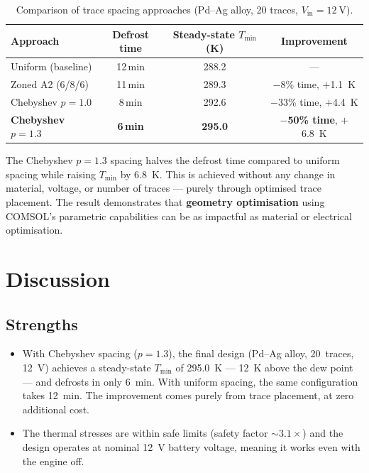 \begin{table}[H]
    \centering
    \caption{Comparison of trace spacing approaches (Pd--Ag alloy, 20 traces, $V_\text{in} = \SI{12}{\volt}$).}
    \label{tab:pattern-comparison}
    \begin{tabular}{@{}lccc@{}}
        \toprule
        \textbf{Approach} & \textbf{Defrost time} & \textbf{Steady-state} $T_\text{min}$ \textbf{(K)} & \textbf{Improvement} \\
        \midrule
        Uniform (baseline)       & 12\,min & 288.2 & --- \\
        Zoned A2 (6/8/6)         & 11\,min & 289.3 & $-$8\% time, $+$\SI{1.1}{\kelvin} \\
        Chebyshev $p = 1.0$      & 8\,min  & 292.6 & $-$33\% time, $+$\SI{4.4}{\kelvin} \\
        \textbf{Chebyshev $p = 1.3$} & \textbf{6\,min} & \textbf{295.0} & $-$\textbf{50\% time}, $+$\SI{6.8}{\kelvin} \\
        \bottomrule
    \end{tabular}
\end{table}

The Chebyshev $p = 1.3$ spacing halves the defrost time compared to uniform spacing while raising $T_\text{min}$ by \SI{6.8}{\kelvin}. This is achieved without any change in material, voltage, or number of traces --- purely through optimised trace placement. The result demonstrates that \textbf{geometry optimisation} using COMSOL's parametric capabilities can be as impactful as material or electrical optimisation.


\section{Discussion}
\label{sec:discussion}

\subsection{Strengths}

\begin{itemize}
    \item With Chebyshev spacing ($p = 1.3$), the final design (Pd--Ag alloy, 20~traces, \SI{12}{\volt}) achieves a steady-state $T_\text{min}$ of \SI{295.0}{\kelvin} --- \SI{12}{\kelvin} above the dew point --- and defrosts in only \SI{6}{\minute}. With uniform spacing, the same configuration takes \SI{12}{\minute}. The improvement comes purely from trace placement, at zero additional cost.

    \item The thermal stresses are within safe limits (safety factor $\sim 3.1 \times$) and the design operates at nominal \SI{12}{\volt} battery voltage, meaning it works even with the engine off.

\end{itemize}


